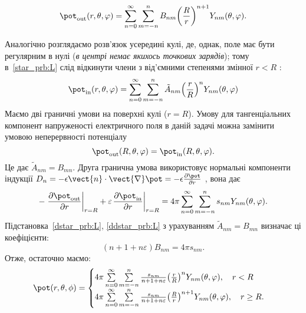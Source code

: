 \begin{problem}
\begin{solution}
	\begin{equation}\label{dstar_prb:L}
		\pot_\mathrm{out}(r,\theta ,\varphi ) = \sum\limits_{n = 0}^\infty  {\sum\limits_{m =  - n}^n {{B_{nm}}{{\left( {\frac{R}{r}} \right)}^{n + 1}}{Y_{nm}}(\theta ,\varphi )} }.
	\end{equation}

	Аналогічно розглядаємо розв’язок усередині кулі, де, однак, поле має бути регулярним в нулі (\emph{в центрі немає якихось точкових зарядів}); тому в~\eqref{star_prb:L} слід відкинути члени з від'ємними степенями змінної $r < R$ :
	\begin{equation}\label{ddstar_prb:L}
		\pot_\mathrm{in}(r,\theta ,\varphi ) = \sum\limits_{n = 0}^\infty  {\sum\limits_{m =  - n}^n {{{\tilde A}_{nm}}{{\left( {\frac{r}{R}} \right)}^n}{Y_{nm}}(\theta ,\varphi )} }
	\end{equation}
	Маємо дві граничні умови на поверхні кулі ($r = R$). Умову для тангенціальних компонент напруженості електричного поля в даній задачі можна замінити умовою неперервності потенціалу
	\[
		\pot_\mathrm{out}(R,\theta ,\varphi ) = {\pot_\mathrm{in}}(R,\theta ,\varphi ).
	\]
	Це дає  $\tilde{A}_{nm} = B_{mn}$.
	Друга гранична умова використовує нормальні компоненти індукції $D_n =  - \epsilon \vect{n} \cdot \vect{\nabla}\pot  =  - \epsilon \frac{\partial \pot }{\partial r}$ , вона дає
	\[
		- \left. {\frac{{\partial {\pot_\mathrm{out}}}}{{\partial r}}} \right|_{r = R} + \varepsilon {\left. {\frac{{\partial {\pot_\mathrm{in}}}}{{\partial r}}} \right|_{r = R}} = 4\pi \sum\limits_{n = 0}^\infty  {\sum\limits_{m =  - n}^n {{s_{nm}}{Y_{nm}}(\theta ,\varphi )} }.
	\]
	Підстановка~\eqref{dstar_prb:L}, \eqref{ddstar_prb:L} з урахуванням  $\tilde{A}_{nm} = B_{mn}$ визначає ці коефіцієнти:
	\[
		\left( n + 1 + n\varepsilon  \right)B_{nm} = 4\pi s_{nm}.
	\]
	Отже, остаточно маємо:
	\[
		\pot(r,\theta,\phi) =
		\begin{cases}
			4\pi \sum\limits_{n = 0}^\infty  {\sum\limits_{m =  - n}^n {\frac{{{s_{nm}}}}{{n + 1 + n\varepsilon }}{{\left( {\frac{r}{R}} \right)}^n}{Y_{nm}}(\theta ,\varphi )} } , \quad r < R \\
			4\pi \sum\limits_{n = 0}^\infty  {\sum\limits_{m =  - n}^n {\frac{{{s_{nm}}}}{{n + 1 + n\varepsilon }}{{\left( {\frac{R}{r}} \right)}^{n + 1}}{Y_{nm}}(\theta ,\varphi )} } , \quad r \ge R.
		\end{cases}
	\]

\end{solution}
\end{problem}

